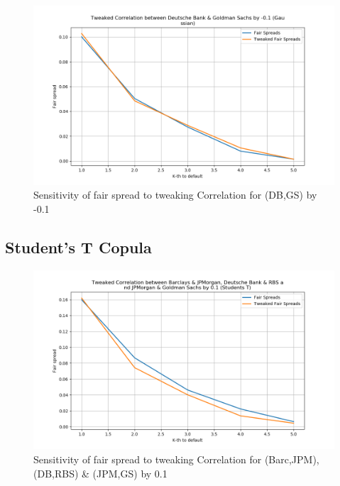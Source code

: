 \documentclass{report}
\theoremstyle{plain}
\theoremstyle{definition}
\begin{document}
\begin{figure}[H]
	\begin{center}
		\includegraphics[width=15cm]{Tweaked_Correlation_between_Deutsche_Bank_&_Goldman_Sachs_by_-0,1_(Gaussian).png}
		\caption{Sensitivity of fair spread to tweaking Correlation for (DB,GS) by -0.1} 
		\label{Tweaked_Correlation_between_Deutsche_Bank_&_Goldman_Sachs_by_-0.1_(Gaussian)}
	\end{center}
\end{figure}


\subsection{Student's T Copula}

\begin{figure}[H]
	\begin{center}
		\includegraphics[width=15cm]{Tweaked_Correlation_between_Barclays_&_JPMorgan,_Deutsche_Bank_&_RBS_and_JPMorgan_&_Goldman_Sachs_by_0,1_(Students_T).png}
		\caption{Sensitivity of fair spread to tweaking Correlation for (Barc,JPM), (DB,RBS) \& (JPM,GS) by 0.1} 
		\label{Tweaked_Correlation_between_Barclays_&_JPMorgan,_Deutsche_Bank_&_RBS_and_JPMorgan_&_Goldman_Sachs_by_0.1_(Students_T)}
	\end{center}
\end{figure}
\end{document}
